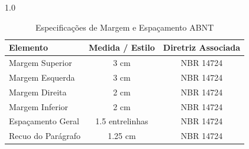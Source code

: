 \begin{table}[h!]
  \centering
  \caption{Especificações de Margem e Espaçamento ABNT}
  \label{tab:margens_abnt}
  \begin{spacing}{1.0} %
    \begin{tabular}{l c c}
      \hline
      \textbf{Elemento} & \textbf{Medida / Estilo} & \textbf{Diretriz Associada} \\
      \hline
      Margem Superior & 3 cm & NBR 14724 \\
      Margem Esquerda & 3 cm & NBR 14724 \\
      Margem Direita  & 2 cm & NBR 14724 \\
      Margem Inferior & 2 cm & NBR 14724 \\
      Espaçamento Geral & 1.5 entrelinhas & NBR 14724 \\
      Recuo do Parágrafo & 1.25 cm & NBR 14724 \\
      \hline
    \end{tabular}
  \end{spacing}
\end{table}
